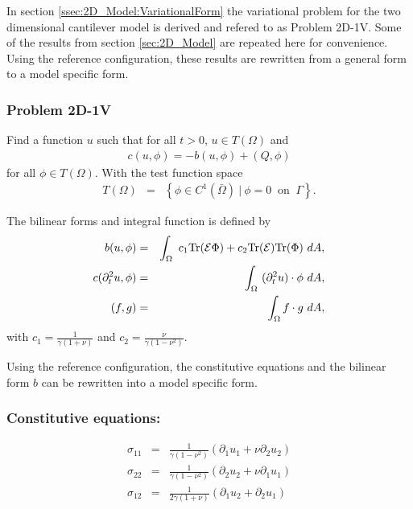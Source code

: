 \documentclass[../../main.tex]{subfiles}
\begin{document}
In section \ref{ssec:2D_Model:VariationalForm} the variational problem for the two dimensional cantilever model is derived and refered to as Problem 2D-1V. Some of the results from section \ref{sec:2D_Model} are repeated here for convenience. Using the reference configuration, these results are rewritten from a general form to a model specific form.

\subsubsection{Problem 2D-1V}\label{sssec:2D_Model:Problem2D1VChp5}
Find a function $u$ such that for all $t>0$, $u \in T(\Omega)$ and 
\begin{align}
	c(u,\phi) = -b(u,\phi) + (Q,\phi) \label{eq:2D_Model:Problem2D1VEqChp5}
\end{align}
for all $\phi \in T(\Omega)$. With the test function space 
\begin{eqnarray*}
	T(\Omega) & = & \left\{ \phi \in C^1(\bar{\Omega}) \ | \ \phi = 0 \ \textrm{ on } \ \Gamma \right\}.
\end{eqnarray*}

The bilinear forms and integral function is defined by
\begin{eqnarray}
	b(u,\phi) & = & \int_\Omega~c_1\textrm{Tr}({\cal E}\Phi)+ c_2\textrm{Tr}({\cal E})
	\textrm{Tr}(\Phi) ~dA, \label{eq:2D_Model:BilinearChp5}\\
	c(\partial_t^2 u,\phi) & = & \int_\Omega~ (\partial^2_t u) \cdot \phi~dA, \label{eq:2D_Model:Bilinear_cChp5}\\
	(f,g) &=& \int_{\Omega} f\cdot g \ dA, \label{eq:2D_Model:Bilinear_intChp5}
\end{eqnarray}
with $\displaystyle c_1 = \frac{1}{\gamma(1+\nu)}$ and $\displaystyle c_2 = \frac{\nu}{\gamma(1-\nu^2)}$.

Using the reference configuration, the constitutive equations and the bilinear form $b$ can be rewritten into a model specific form.

\subsubsection{Constitutive equations:}
\begin{eqnarray}
	\sigma_{11} & = & \frac{1}{\gamma(1-\nu^2)}(\partial_1 u_1 + \nu \partial_2 u_2) \label{CE1} \\
	\sigma_{22} & = & \frac{1}{\gamma(1-\nu^2)}(\partial_2 u_2 + \nu \partial_1 u_1) \label{CE2} \\
	\sigma_{12} & = & \frac{1}{2\gamma(1+\nu)}(\partial_1 u_2 + \partial_2 u_1) \label{CE3}
\end{eqnarray}
\end{document}
